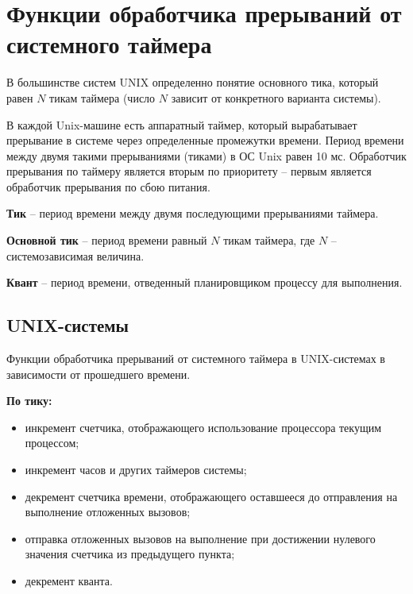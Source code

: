 \chapter{Функции обработчика прерываний от системного таймера}

В большинстве систем UNIX определенно понятие основного тика, который равен $N$ тикам таймера (число $N$ зависит от конкретного варианта системы).

В каждой {\ttfamily Unix}-машине есть аппаратный таймер, который вырабатывает прерывание в системе через определенные промежутки времени. Период времени между двумя такими прерываниями (тиками) в ОС {\ttfamily Unix} равен 10 мс. Обработчик прерывания по таймеру является вторым по приоритету – первым является обработчик прерывания по сбою питания.

\textbf{Тик} -- период времени между двумя последующими прерываниями таймера.

\textbf{Основной тик} -- период времени равный $N$ тикам таймера, где $N$ -- системозависимая величина.

\textbf{Квант} -- период времени, отведенный планировщиком процессу для выполнения.

\section{UNIX-системы}

Функции обработчика прерываний от системного таймера в UNIX-системах в зависимости от прошедшего времени.

\textbf{По тику:}
\begin{itemize}
	\item инкремент счетчика, отображающего использование процессора текущим процессом;
	\item инкремент часов и других таймеров системы;
	\item декремент счетчика времени, отображающего оставшееся до отправления на выполнение отложенных вызовов;
	\item отправка отложенных вызовов на выполнение при достижении нулевого значения счетчика из предыдущего пункта;
	\item декремент кванта.
\end{itemize}

